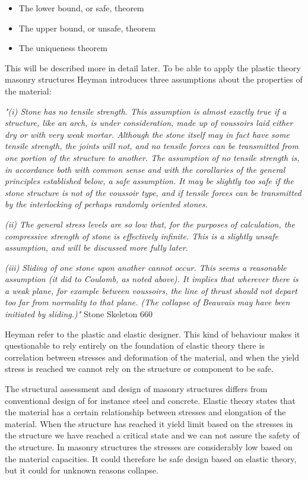 \begin{itemize}
\item The lower bound, or safe, theorem
\item The upper bound, or unsafe, theorem
\item The uniqueness theorem
\end{itemize}

This will be described more in detail later. To be able to apply the plastic theory masonry structures Heyman introduces three assumptions about the properties of the material:


\textit{"(i) Stone has no tensile strength. This assumption is almost exactly true if a structure,
like an arch, is under consideration, made up of voussoirs laid either dry or with very
weak mortar. Although the stone itself may in fact have some tensile strength, the joints
will not, and no tensile forces can be transmitted from one portion of the structure to
another. The assumption of no tensile strength is, in accordance both with common sense
and with the corollaries of the general principles established below, a safe assumption.
It may be slightly too safe if the stone structure is not of the voussoir type, and if tensile
forces can be transmitted by the interlocking of perhaps randomly oriented stones.}

\textit{(ii) The general stress levels are so low that, for the purposes of calculation, the compressive
strength of stone is effectively infinite. This is a slightly unsafe assumption, and
will be discussed more fully later.}

\textit{(iii) Sliding of one stone upon another cannot occur. This seems a reasonable assumption
(it did to Coulomb, as noted above). It implies that wherever there is a weak plane, for
example between voussoirs, the line of thrust should not depart too far from normality
to that plane. (The collapse of Beauvais may have been initiated by sliding.)" }Stone Skeleton 660

Heyman refer to the plastic and elastic designer. This kind of behaviour makes it questionable to rely entirely on the foundation of elastic theory there is correlation between stresses and deformation of the material, and when the yield stress is reached we cannot rely on the structure or component to be safe. 

The structural assessment and design of masonry structures differs from conventional design of for instance steel and concrete. Elastic theory states that the material has a certain relationship between stresses and elongation of the material. When the structure has reached it yield limit based on the stresses in the structure we have reached a critical state and we can not assure the safety of the structure. In masonry structures the stresses are considerably low based on the material capacities. It could therefore be safe design based on elastic theory, but it could for unknown reasons collapse. 




